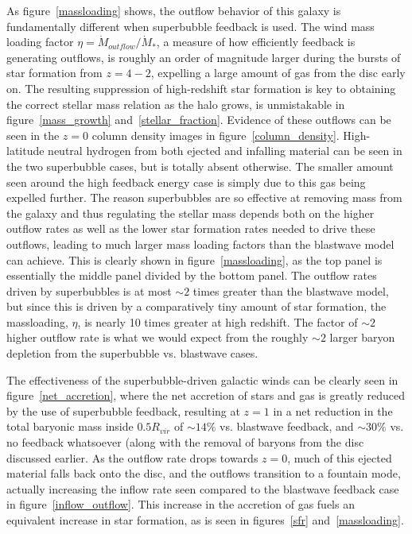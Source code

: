 As figure~\ref{massloading} shows, the outflow behavior of this galaxy is
fundamentally different when superbubble feedback is used.  The wind mass
loading factor $\eta = \dot M_{outflow} / \dot M_*$, a measure of how
efficiently feedback is generating outflows, is roughly an order of magnitude
larger during the bursts of star formation from $z=4-2$, expelling a large
amount of gas from the disc early on.  The resulting suppression of
high-redshift star formation is key to obtaining the correct stellar mass
relation as the halo grows, is unmistakable in figure~\ref{mass_growth}
and~\ref{stellar_fraction}.  Evidence of these outflows can be seen in the $z=0$
column density images in figure~\ref{column_density}.  High-latitude neutral
hydrogen from both ejected and infalling material can be seen in the two
superbubble cases, but is totally absent otherwise.  The smaller amount seen
around the high feedback energy case is simply due to this gas being expelled
further.  The reason superbubbles are so effective at removing mass from the
galaxy and thus regulating the stellar mass depends both on the higher outflow
rates as well as the lower star formation rates needed to drive these outflows,
leading to much larger mass loading factors than the blastwave model can
achieve.  This is clearly shown in figure~\ref{massloading}, as the top panel is
essentially the middle panel divided by the bottom panel.  The outflow rates
driven by superbubbles is at most $\sim2$ times greater than the blastwave model,
but since this is driven by a comparatively tiny amount of star formation, the
massloading, $\eta$, is nearly 10 times greater at high redshift.  The factor of
$\sim2$ higher outflow rate is what we would expect from the roughly $\sim2$
larger baryon depletion from the superbubble vs. blastwave cases.

The effectiveness of the superbubble-driven galactic winds can be clearly seen
in figure~\ref{net_accretion}, where the net accretion of stars and gas is
greatly reduced by the use of superbubble feedback, resulting at $z=1$ in a net
reduction in the total baryonic mass inside $0.5R_{vir}$ of $\sim14\%$ vs.
blastwave feedback, and $\sim30\%$ vs. no feedback whatsoever (along with the 
removal of baryons from the disc discussed earlier. As the outflow
rate drops towards $z=0$, much of this ejected material falls back onto the
disc, and the outflows transition to a fountain mode, actually increasing
the inflow rate seen compared to the blastwave feedback case in
figure~\ref{inflow_outflow}.  This increase in the accretion of gas fuels an
equivalent increase in star formation, as is seen in figures~\ref{sfr}
and~\ref{massloading}.


